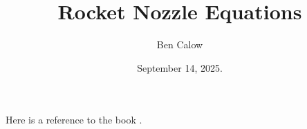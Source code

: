 \documentclass{article}
\title{Rocket Nozzle Equations}
\author{Ben Calow}
\date{September 14, 2025.}
\begin{document}
\maketitle

Here is a reference to the book \cite{RPE}.



\end{document}

